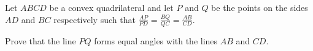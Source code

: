 Let $ABCD$ be a convex quadrilateral and let $P$ and $Q$ be the points on the sides $AD$ and $BC$ respectively such that $\frac{AP}{PD}=\frac{BQ}{QC}=\frac{AB}{CD}$.

Prove that the line $PQ$ forms equal angles with the lines $AB$ and $CD$.